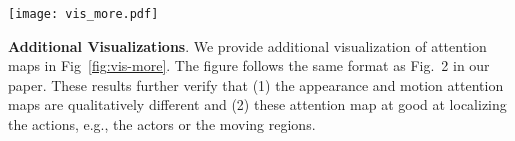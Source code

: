 \documentclass{bmvc2k}
\begin{document}
\begin{figure*}[t]
\centering
\texttt{[image: vis\_more.pdf]}
\caption{Visualization of attention maps from our full model and Soft-Atten. For each 24 frames video clip, we plot the attention heatmap over the first frame and last frame. Our model produces qualitatively different appearance and motion attention maps. And these attention maps are better at localizing the actions when compared to vanilla soft attention. }
\label{fig:vis-more}
\vspace{-1em}
\end{figure*}
\noindent \textbf{Additional Visualizations}. We provide additional visualization of attention maps in Fig~\ref{fig:vis-more}. The figure follows the same format as Fig.\ 2 in our paper. These results further verify that (1) the appearance and motion attention maps are qualitatively different and (2) these attention map at good at localizing the actions, e.g., the actors or the moving regions.\\
\end{document}
